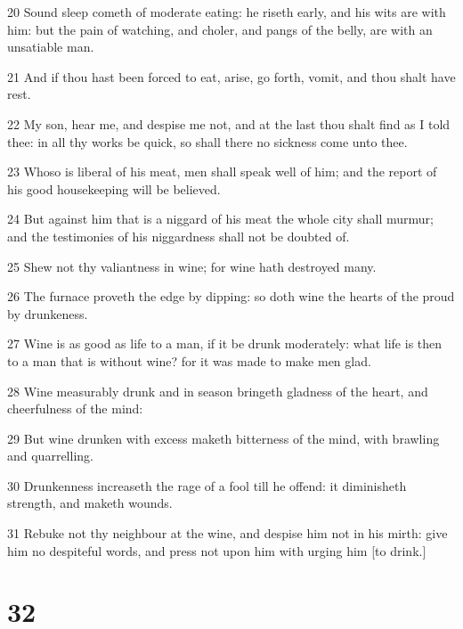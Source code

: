 \par 20 Sound sleep cometh of moderate eating: he riseth early, and his wits are with him: but the pain of watching, and choler, and pangs of the belly, are with an unsatiable man.
\par 21 And if thou hast been forced to eat, arise, go forth, vomit, and thou shalt have rest.
\par 22 My son, hear me, and despise me not, and at the last thou shalt find as I told thee: in all thy works be quick, so shall there no sickness come unto thee.
\par 23 Whoso is liberal of his meat, men shall speak well of him; and the report of his good housekeeping will be believed.
\par 24 But against him that is a niggard of his meat the whole city shall murmur; and the testimonies of his niggardness shall not be doubted of.
\par 25 Shew not thy valiantness in wine; for wine hath destroyed many.
\par 26 The furnace proveth the edge by dipping: so doth wine the hearts of the proud by drunkeness.
\par 27 Wine is as good as life to a man, if it be drunk moderately: what life is then to a man that is without wine? for it was made to make men glad.
\par 28 Wine measurably drunk and in season bringeth gladness of the heart, and cheerfulness of the mind:
\par 29 But wine drunken with excess maketh bitterness of the mind, with brawling and quarrelling.
\par 30 Drunkenness increaseth the rage of a fool till he offend: it diminisheth strength, and maketh wounds.
\par 31 Rebuke not thy neighbour at the wine, and despise him not in his mirth: give him no despiteful words, and press not upon him with urging him [to drink.]

\chapter{32}

